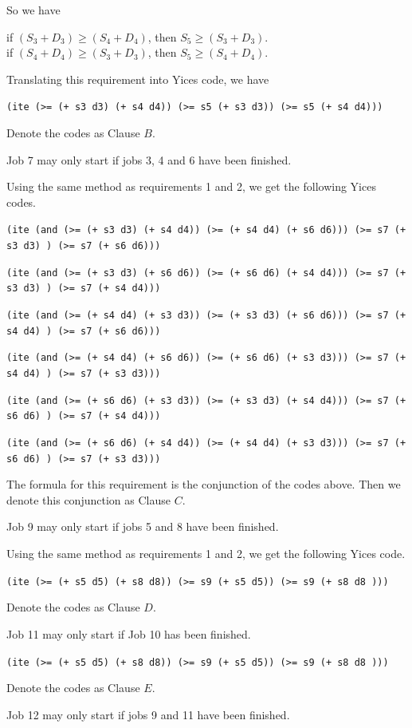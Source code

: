 \documentclass[11pt]{article}
\begin{document}
{{\begin{description}
  So we have
  \begin{center}
  if $(S_{3}+D_{3}) \geq (S_{4}+D_{4})$, then $S_{5} \geq (S_{3}+D_{3})$.\\
  if $(S_{4}+D_{4}) \geq (S_{3}+D_{3})$, then $S_{5} \geq (S_{4}+D_{4})$.
  \end{center}
  Translating this requirement into Yices code, we have
  \begin{center}
  {\tt (ite (>= (+ s3 d3) (+ s4 d4)) (>= s5 (+ s3 d3)) (>= s5 (+ s4 d4)))}
  \end{center}
  Denote the codes as Clause $B$.
  \item[Requirement 5:] Job 7 may only start if jobs 3, 4 and 6 have been finished.

  Using the same method as requirements 1 and 2, we get the following Yices codes.
  \begin{center}
  {\tt (ite (and (>= (+ s3 d3) (+ s4 d4)) (>= (+ s4 d4) (+ s6 d6))) (>= s7 (+ s3 d3) ) (>= s7 (+ s6 d6)))}

  {\tt (ite (and (>= (+ s3 d3) (+ s6 d6)) (>= (+ s6 d6) (+ s4 d4))) (>= s7 (+ s3 d3) ) (>= s7 (+ s4 d4)))}

  {\tt (ite (and (>= (+ s4 d4) (+ s3 d3)) (>= (+ s3 d3) (+ s6 d6))) (>= s7 (+ s4 d4) ) (>= s7 (+ s6 d6)))}

  {\tt (ite (and (>= (+ s4 d4) (+ s6 d6)) (>= (+ s6 d6) (+ s3 d3))) (>= s7 (+ s4 d4) ) (>= s7 (+ s3 d3)))}

  {\tt (ite (and (>= (+ s6 d6) (+ s3 d3)) (>= (+ s3 d3) (+ s4 d4))) (>= s7 (+ s6 d6) ) (>= s7 (+ s4 d4)))}

  {\tt (ite (and (>= (+ s6 d6) (+ s4 d4)) (>= (+ s4 d4) (+ s3 d3))) (>= s7 (+ s6 d6) ) (>= s7 (+ s3 d3)))}
  \end{center}
  The formula for this requirement is the conjunction of the codes above. Then we denote this conjunction as Clause $C$.
  \item[Requirement 6:] Job 9 may only start if jobs 5 and 8 have been finished.

  Using the same method as requirements 1 and 2, we get the following Yices code.
  \begin{center}
  {\tt (ite (>= (+ s5 d5) (+ s8 d8)) (>= s9 (+ s5 d5)) (>= s9 (+ s8 d8 )))}
  \end{center}
  Denote the codes as Clause $D$.
  \item[Requirement 7:] Job 11 may only start if Job 10 has been finished.

  \begin{center}
  {\tt (ite (>= (+ s5 d5) (+ s8 d8)) (>= s9 (+ s5 d5)) (>= s9 (+ s8 d8 )))}
  \end{center}
  Denote the codes as Clause $E$.
  \item[Requirement 8:] Job 12 may only start if jobs 9 and 11 have been finished.


\end{description}}}
\end{document}
